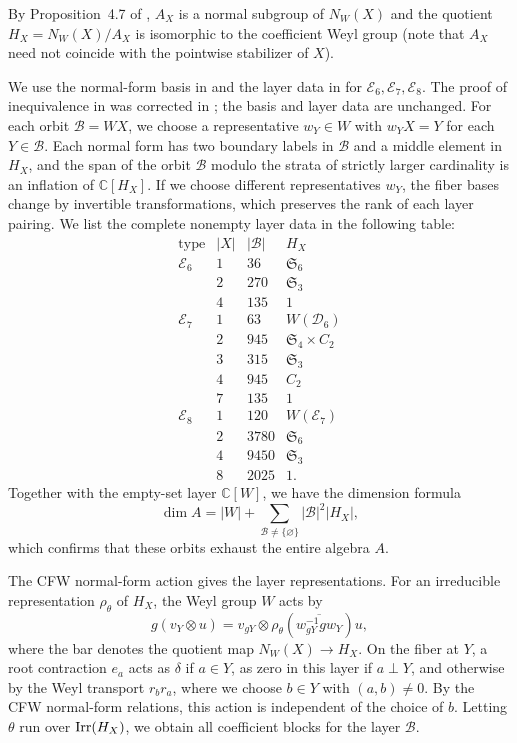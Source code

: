 \documentclass[11pt,a4paper]{amsart}
\theoremstyle{uprightdefinition}
\theoremstyle{remark}\newtheorem{remark}[theorem]{Remark}
\begin{document}
By Proposition~4.7 of \cite{CFW2009}, $A_X$ is a normal subgroup of
$N_W(X)$ and the quotient $H_X=N_W(X)/A_X$ is isomorphic to the coefficient Weyl group
(note that $A_X$ need not coincide with
the pointwise stabilizer of $X$).

We use the normal-form basis in
\cite[Proposition~4.9 and Corollary~5.5]{CFW2009} and the layer data in
\cite[Lemma~1.3 and Table~3]{CFW2009} for $\mathscr{E}_6,\mathscr{E}_7,\mathscr{E}_8$.
The proof of inequivalence in \cite[Proposition~5.4]{CFW2009}
was corrected in \cite{CFWerr2019}; the basis and layer data are unchanged.
For each orbit $\mathcal B=WX$, we choose a representative $w_Y\in W$ with $w_YX=Y$ for each $Y\in\mathcal B$.
Each normal form has two boundary labels in $\mathcal B$ and a
middle element in $H_X$, and the span of the orbit $\mathcal B$ modulo the strata of strictly larger
cardinality is an inflation of $\mathbb C[H_X]$.
If we choose different representatives $w_Y$, the fiber bases change by invertible transformations, which preserves the rank of each layer pairing. We list the complete nonempty layer data in the following table:
\[
\begin{array}{c|r|r|c}
\text{type}&|X|&|\mathcal B|&H_X\\\hline
 \mathscr{E}_6&1&36&\mathfrak S_6\\
    &2&270&\mathfrak S_3\\
    &4&135&1\\\hline
 \mathscr{E}_7&1&63&W(\mathscr{D}_6)\\
    &2&945&\mathfrak S_4\times C_2\\
    &3&315&\mathfrak S_3\\
    &4&945&C_2\\
    &7&135&1\\\hline
 \mathscr{E}_8&1&120&W(\mathscr{E}_7)\\
    &2&3780&\mathfrak S_6\\
    &4&9450&\mathfrak S_3\\
    &8&2025&1.
\end{array}
\]
Together with the empty-set layer $\mathbb C[W]$, we have the dimension formula
\[
 \dim A=|W|+\sum_{\mathcal B\ne\{\varnothing\}}
       |\mathcal B|^2|H_X|,
\]
which confirms that these orbits exhaust the entire algebra $A$.

The CFW normal-form action gives the layer representations. For an irreducible representation $\rho_\theta$
of $H_X$, the Weyl group $W$ acts by
\[
 g(v_Y\otimes u)=v_{gY}\otimes
 \rho_\theta\!\left(\overline{w_{gY}^{-1}gw_Y}\right)u,
\]
where the bar denotes the quotient map $N_W(X)\to H_X$.
On the fiber at $Y$, a root contraction $e_a$
acts as $\delta$ if $a\in Y$, as zero in this layer if $a\perp Y$,
and otherwise by the Weyl transport $r_b r_a$, where we choose
$b\in Y$ with $(a,b)\ne0$. By the CFW normal-form relations, this
action is independent of the choice of $b$. Letting $\theta$ run over $\operatorname{Irr}(H_X)$,
we obtain all coefficient blocks for the layer $\mathcal B$.
\end{document}
